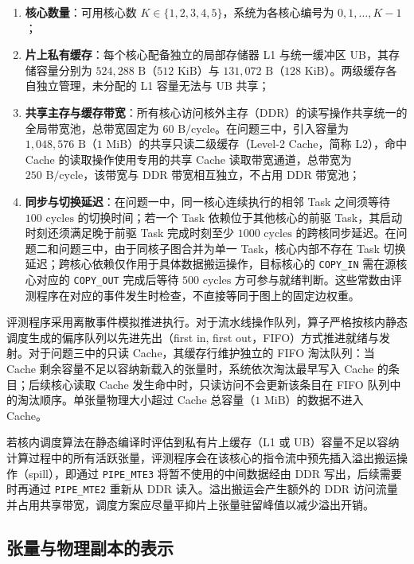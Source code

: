 \documentclass[anonymous,withtoc]{gmcm2026}
\providecommand{\tightlist}{\setlength{\itemsep}{0pt}\setlength{\parskip}{0pt}}
\begin{document}
\begin{enumerate}
\def\labelenumi{\arabic{enumi}.}
\tightlist
\item
  \textbf{核心数量}：可用核心数 \(K \in \{1, 2, 3, 4, 5\}\)，系统为各核心编号为 \(0, 1, \dots, K-1\)；
\item
  \textbf{片上私有缓存}：每个核心配备独立的局部存储器 L1 与统一缓冲区 UB，其存储容量分别为 \(524{,}288\text{ B}\)（\(512\text{ KiB}\)）与 \(131{,}072\text{ B}\)（\(128\text{ KiB}\)）。两级缓存各自独立管理，未分配的 L1 容量无法与 UB 共享；
\item
  \textbf{共享主存与缓存带宽}：所有核心访问核外主存（DDR）的读写操作共享统一的全局带宽池，总带宽固定为 \(60\text{ B/cycle}\)。在问题三中，引入容量为 \(1{,}048{,}576\text{ B}\)（\(1\text{ MiB}\)）的共享只读二级缓存（Level-2 Cache，简称 L2），命中 Cache 的读取操作使用专用的共享 Cache 读取带宽通道，总带宽为 \(250\text{ B/cycle}\)，该带宽与 DDR 带宽相互独立，不占用 DDR 带宽池；
\item
  \textbf{同步与切换延迟}：在问题一中，同一核心连续执行的相邻 Task 之间须等待 \(100\text{ cycles}\) 的切换时间；若一个 Task 依赖位于其他核心的前驱 Task，其启动时刻还须满足晚于前驱 Task 完成时刻至少 \(1000\text{ cycles}\) 的跨核同步延迟。在问题二和问题三中，由于同核子图合并为单一 Task，核心内部不存在 Task 切换延迟；跨核心依赖仅作用于具体数据搬运操作，目标核心的 \texttt{COPY\_IN} 需在源核心对应的 \texttt{COPY\_OUT} 完成后等待 \(500\text{ cycles}\) 方可参与就绪判断。这些常数由评测程序在对应的事件发生时检查，不直接等同于图上的固定边权重。
\end{enumerate}

评测程序采用离散事件模拟推进执行。对于流水线操作队列，算子严格按核内静态调度生成的偏序队列以先进先出（first in, first out，FIFO）方式推进就绪与发射。对于问题三中的只读 Cache，其缓存行维护独立的 FIFO 淘汰队列：当 Cache 剩余容量不足以容纳新载入的张量时，系统依次淘汰最早写入 Cache 的条目；后续核心读取 Cache 发生命中时，只读访问不会更新该条目在 FIFO 队列中的淘汰顺序。单张量物理大小超过 Cache 总容量（\(1\text{ MiB}\)）的数据不进入 Cache。

若核内调度算法在静态编译时评估到私有片上缓存（L1 或 UB）容量不足以容纳计算过程中的所有活跃张量，评测程序会在该核心的指令流中预先插入溢出搬运操作（spill），即通过 \texttt{PIPE\_MTE3} 将暂不使用的中间数据经由 DDR 写出，后续需要时再通过 \texttt{PIPE\_MTE2} 重新从 DDR 读入。溢出搬运会产生额外的 DDR 访问流量并占用共享带宽，调度方案应尽量平抑片上张量驻留峰值以减少溢出开销。

\subsection{张量与物理副本的表示}
\end{document}
